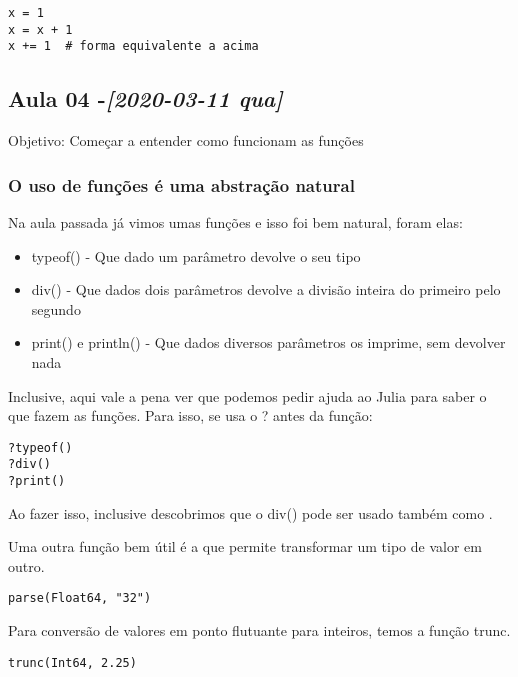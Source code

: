 \documentclass[a4paper]{article}
\begin{document}
\lstset{language=ein-julia,label=org91426f9,caption= ,captionpos=b,numbers=none}
\begin{lstlisting}
x = 1
x = x + 1
x += 1  # forma equivalente a acima
\end{lstlisting}


\subsection{Aula 04 -\textit{[2020-03-11 qua]}}
\label{sec:org9fa0164}
Objetivo: Começar a entender como funcionam as funções
\subsubsection{O uso de funções é uma abstração natural}
\label{sec:org9236734}
Na aula passada já vimos umas funções e isso foi bem natural, foram elas:
\begin{itemize}
\item typeof() - Que dado um parâmetro devolve o seu tipo
\item div() - Que dados dois parâmetros devolve a divisão inteira do primeiro pelo segundo
\item print() e println() - Que dados diversos parâmetros os imprime, sem devolver nada
\end{itemize}
Inclusive, aqui vale a pena ver que podemos pedir ajuda ao Julia para saber o que fazem as
funções. Para isso, se usa o ? antes da função:
\lstset{language=ein-julia,label=org2a0d03c,caption= ,captionpos=b,numbers=none}
\begin{lstlisting}
?typeof()
?div()
?print()
\end{lstlisting}

Ao fazer isso, inclusive descobrimos que o div() pode ser usado também como \textdiv{}.

Uma outra função bem útil é a que permite transformar um tipo de valor em outro.

\lstset{language=ein-julia,label=org83ae32e,caption= ,captionpos=b,numbers=none}
\begin{lstlisting}
parse(Float64, "32")
\end{lstlisting}

Para conversão de valores em ponto flutuante para inteiros, temos a função trunc.

\lstset{language=ein-julia,label=org7e0382a,caption= ,captionpos=b,numbers=none}
\begin{lstlisting}
trunc(Int64, 2.25)
\end{lstlisting}
\end{document}
